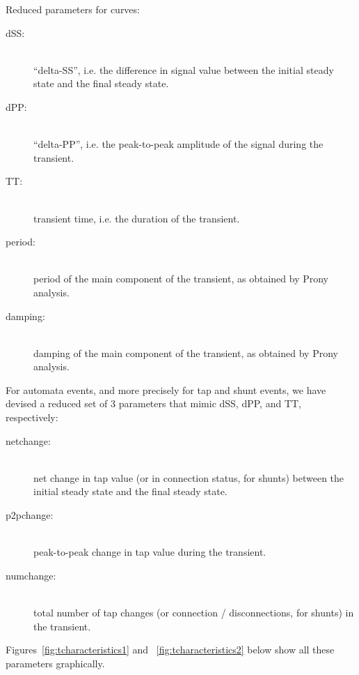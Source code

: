 \documentclass[11pt, a4paper, twoside, titlepage]{article}
\begin{document}
Reduced parameters for curves:

\begin{description}
\item[dSS:] \hfill \\ ``delta-SS'', i.e. the difference in signal value between
  the initial steady state and the final steady state.
\item[dPP:] \hfill \\ ``delta-PP'', i.e. the peak-to-peak amplitude of the
  signal during the transient.
\item[TT:] \hfill \\ transient time, i.e. the duration of the transient.
\item[period:] \hfill \\ period of the main component of the transient, as
  obtained by Prony analysis.
\item[damping:] \hfill \\ damping of the main component of the transient, as
  obtained by Prony analysis.
\end{description}

For automata events, and more precisely for tap and shunt events, we have
devised a reduced set of 3 parameters that mimic dSS, dPP, and TT, respectively:

\begin{description}
\item[netchange:] \hfill \\ net change in tap value (or in connection status,
  for shunts) between the initial steady state and the final steady state.
\item[p2pchange:] \hfill \\ peak-to-peak change in tap value during the
  transient.
\item[numchange:] \hfill \\ total number of tap changes (or connection /
  disconnections, for shunts) in the transient.
\end{description}

Figures~\ref{fig:tcharacteristics1} and ~\ref{fig:tcharacteristics2} below show
all these parameters graphically.
\end{document}
